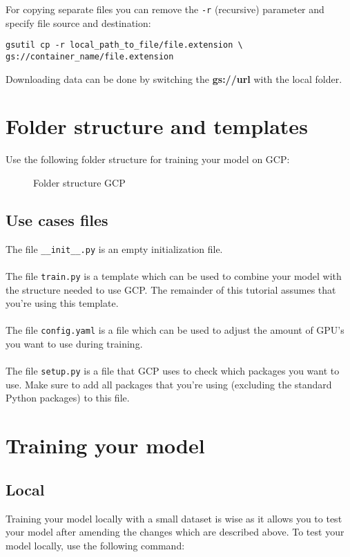 \documentclass{article}
\begin{document}
For copying separate files you can remove the \texttt{-r} (recursive) parameter and specify file source and destination:
\begin{verbatim}
gsutil cp -r local_path_to_file/file.extension \
gs://container_name/file.extension
\end{verbatim}

Downloading data can be done by switching the \textbf{gs://url} with the local folder.

\section{Folder structure and templates}
Use the following folder structure for training your model on GCP:
\begin{figure}[H]
\caption{Folder structure GCP}
\label{fig:fsgcp}
\end{figure}
\subsection{Use cases files}
The file \texttt{\_\_init\_\_.py} is an empty initialization file.
\\
\\
The file \texttt{train.py} is a template which can be used to combine your model with the structure needed to use GCP. The remainder of this tutorial assumes that you're using this template.
\\
\\
The file \texttt{config.yaml} is a file which can be used to adjust the amount of GPU's you want to use during training. 
\\
\\
The file \texttt{setup.py} is a file that GCP uses to check which packages you want to use. Make sure to add all packages that you're using (excluding the standard Python packages) to this file.

\section{Training your model}
\subsection{Local}
Training your model locally with a small dataset is wise as it allows you to test your model after amending the changes which are described above. To test your model locally, use the following command:
\end{document}
